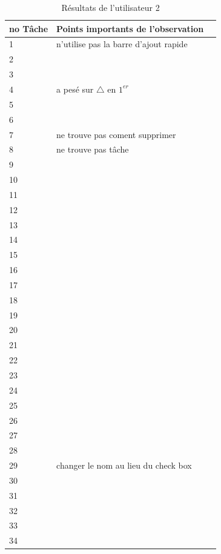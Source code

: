 \documentclass[letterpaper, oneside, 12pt, these, creativecommons]{thETS}
\begin{document}
\newpage

\begin{table}
	\centering
	\begin{tabular}{|l|l|l|}
	\hline
	no Tâche	& Points importants de l'observation	\\ \hline \hline
	1		& n'utilise pas la barre d'ajout rapide	\\ \hline
	2		& 						\\ \hline
	3		& 						\\ \hline
	4		& a pesé sur	$\bigtriangleup$ en $1^{er}$ \\ \hline
	5		& 						\\ \hline
	6		& 						\\ \hline
	7		& ne trouve pas coment supprimer	\\ \hline
	8		& ne trouve pas tâche			\\ \hline
	9		& 						\\ \hline
	10		& 						\\ \hline
	11		& 						\\ \hline
	12		& 						\\ \hline
	13		& 						\\ \hline
	14		& 						\\ \hline
	15		& 						\\ \hline
	16		& 						\\ \hline
	17		& 						\\ \hline
	18		& 						\\ \hline
	19		& 						\\ \hline
	20		& 						\\ \hline
	21		& 						\\ \hline
	22		& 						\\ \hline
	23		& 						\\ \hline
	24		& 						\\ \hline
	25		& 						\\ \hline
	26		& 						\\ \hline
	27		& 						\\ \hline
	28		& 						\\ \hline
	29		& changer le nom au lieu du check box	\\ \hline
	30		& 						\\ \hline
	31		& 						\\ \hline
	32		& 						\\ \hline
	33		& 						\\ \hline
	34		& 						\\ \hline
	\end{tabular}
	\caption{Résultats de l'utilisateur 2}
\end{table}
\end{document}
